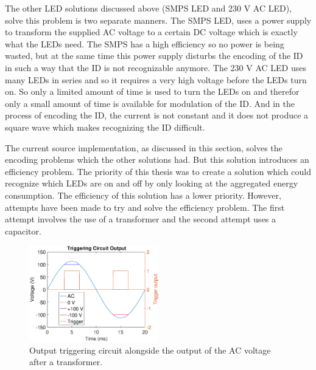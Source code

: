 	The other LED solutions discussed above (SMPS LED and 230 V AC LED), solve this problem is two separate manners.
	The SMPS LED, uses a power supply to transform the supplied AC voltage to a certain DC voltage which is exactly what the LEDs need.
	The SMPS has a high efficiency so no power is being wasted, but at the same time this power supply disturbs the encoding of the ID in such a way that the ID is not recognizable anymore.
	The 230 V AC LED uses many LEDs in series and so it requires a very high voltage before the LEDs turn on.
	So only a limited amount of time is used to turn the LEDs on and therefor only a small amount of time is available for modulation of the ID.
	And in the process of encoding the ID, the current is not constant and it does not produce a square wave which makes recognizing the ID difficult.


	The current source implementation, as discussed in this section, solves the encoding problems which the other solutions had.
	But this solution introduces an efficiency problem.
	The priority of this thesis was to create a solution which could recognize which LEDs are on and off by only looking at the aggregated energy consumption.
	The efficiency of this solution has a lower priority.%
	However, attempts have been made to try and solve the efficiency problem.
	The first attempt involves the use of a transformer and the second attempt uses a capacitor.

	\begin{figure}[b]
		\centering
		\includegraphics[angle=0,width=0.5\textwidth]{chapters/hardware-chapters/AC/ac-modulator/custom-hardware/ac-current-source/ac-wave-lower-transformed-triggering.eps}
		\caption{Output triggering circuit alongside the output of the AC voltage after a transformer.}
		\label{fig:trigger-output-lower-transformed}
	\end{figure}


